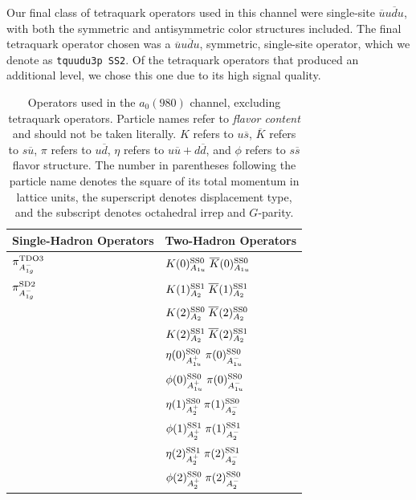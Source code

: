 Our final class of tetraquark operators used in this channel were single-site $\overline u u \overline d u$, with both the symmetric and antisymmetric color structures included. The final tetraquark operator chosen was a $\overline u u \overline d u$, symmetric, single-site operator, which we denote as \verb+tquudu3p SS2+. Of the tetraquark operators that produced an additional level, we chose this one due to its high signal quality.
\begin{table}
  \centering
  \begin{tabular}{l|l}
    \textbf{Single-Hadron Operators} & \textbf{Two-Hadron Operators}\\
    \hline
    $\pi^{\rm{TDO}3}_{A_{1g}^-}$ & $K(0)^{\rm{SS}0}_{A_{1u}}\; \overline K(0)^{\rm{SS}0}_{A_{1u}}$\\
    $\pi^{\rm{SD}2}_{A_{1g}^-}$ & $K(1)^{\rm{SS}1}_{A_{2}}\; \overline K(1)^{\rm{SS}1}_{A_{2}}$ \\
    & $K(2)^{\rm{SS}0}_{A_{2}}\; \overline K(2)^{\rm{SS}0}_{A_{2}}$ \\
    & $K(2)^{\rm{SS}1}_{A_{2}}\; \overline K(2)^{\rm{SS}1}_{A_{2}}$ \\
    & $\eta(0)^{\rm{SS}0}_{A_{1u}^+}\; \pi(0)^{\rm{SS}0}_{A_{1u}^-}$ \\
    & $\phi(0)^{\rm{SS}0}_{A_{1u}^+}\; \pi(0)^{\rm{SS}0}_{A_{1u}^-}$ \\
    & $\eta(1)^{\rm{SS}0}_{A_{2}^+}\; \pi(1)^{\rm{SS}0}_{A_{2}^-}$ \\
    & $\phi(1)^{\rm{SS}1}_{A_{2}^+}\; \pi(1)^{\rm{SS}1}_{A_{2}^-}$ \\
    & $\eta(2)^{\rm{SS}1}_{A_{2}^+}\; \pi(2)^{\rm{SS}1}_{A_{2}^-}$ \\
    & $\phi(2)^{\rm{SS}0}_{A_{2}^+}\; \pi(2)^{\rm{SS}0}_{A_{2}^-}$ 
  \end{tabular}
  \caption{Operators used in the $a_0(980)$ channel, excluding tetraquark operators. Particle names refer to \emph{flavor content} and should not be taken literally. $K$ refers to $u\overline s$, $\overline K$ refers to $s \overline u$, $\pi$ refers to $u\overline d$, $\eta$ refers to $u\overline u + d\overline d$, and $\phi$ refers to $s\overline s$ flavor structure. The number in parentheses following the particle name denotes the square of its total momentum in lattice units, the superscript denotes displacement type, and the subscript denotes octahedral irrep and $G$-parity.}
  \label{table:a0_ops_no_tq}
\end{table}

